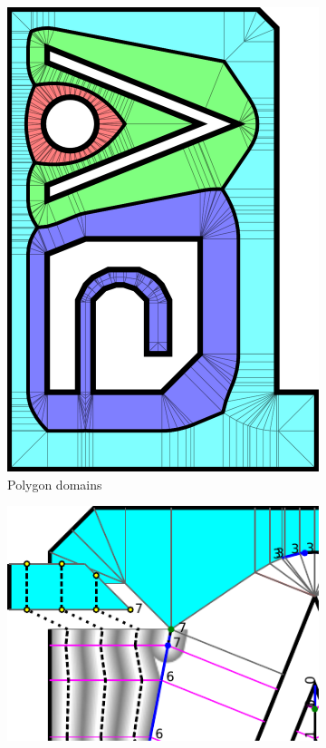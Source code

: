 \begin{figure}
\centering
\setlength{\figheight}{.3\columnwidth}
\begin{subfigure}{.5\columnwidth}\centering
\includegraphics[width=\figheight,rotate=90]{sources-method-domains.pdf}
\caption{Polygon domains}\label{shape_decomposition_domains}
\end{subfigure}
\begin{subfigure}{.45\columnwidth}\centering
\includegraphics[height=\figheight]{sources-method-segment-generation.pdf}

\end{subfigure}
\end{figure}
